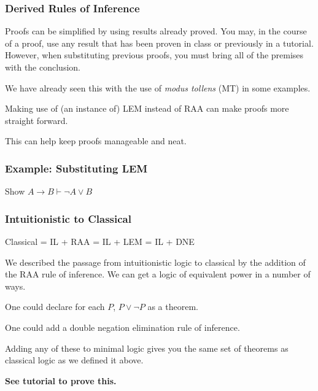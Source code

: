 \documentclass{beamer}
\begin{document}
\begin{frame}
	\frametitle{Derived Rules of Inference}
	
	Proofs can be simplified by using results already proved. You may, in the course of a proof, use any result that has been proven in class or previously in a tutorial. However, when substituting previous proofs, you must bring all of the premises with the conclusion. 
	
	\vspace{0.5cm}
	
	We have already seen this with the use of \emph{modus tollens} (MT) in some examples.
	
	\vspace{0.5cm} 
	
	Making use of (an instance of) LEM instead of RAA can make proofs more straight forward. 

	\vspace{0.5cm}

	This can help keep proofs manageable and neat. 

\end{frame}

\begin{frame}
	\frametitle{Example: Substituting LEM}
	
	Show $A \rightarrow B \vdash \lnot A \lor B$
	
	\vspace{7cm}
		
	
\end{frame}

\begin{frame}
  \frametitle{Intuitionistic to Classical}

  	\begin{center}
	Classical = IL + RAA = IL + LEM = IL + DNE
	\end{center}

	\vspace{0.3cm}

    We described the passage from intuitionistic logic to classical by the addition of the RAA rule of inference. We can get a logic of equivalent power in a number of ways. 

    \vspace{0.3cm}

    One could declare for each $P$,  $P \lor \lnot P$ as a theorem. 

    \vspace{0.3cm}

    One could add a double negation elimination rule of inference. 

    \vspace{0.3cm}

    Adding any of these to minimal logic gives you the same set of theorems as classical logic as we defined it above. 

	{\bf See tutorial to prove this.}

\end{frame}
\end{document}
